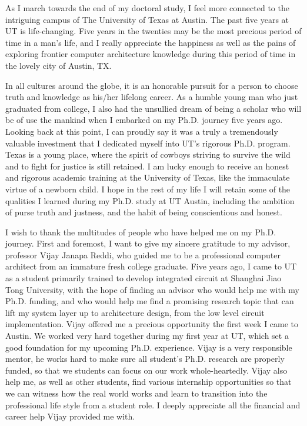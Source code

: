 
\begin{acknowledgments}		%

As I march towards the end of my doctoral study, I feel more connected to the intriguing campus of The University of Texas at Austin. The past five years at UT is life-changing. Five years in the twenties may be the most precious period of time in a man's life, and I really appreciate the happiness as well as the pains of exploring frontier computer architecture knowledge during this period of time in the lovely city of Austin, TX.

In all cultures around the globe, it is an honorable pursuit for a person to choose truth and knowledge as his/her lifelong career. As a humble young man who just graduated from college, I also had the unsullied dream of being a scholar who will be of use the mankind when I embarked on my Ph.D. journey five years ago. Looking back at this point, I can proudly say it was a truly a tremendously valuable investment that I dedicated myself into UT's rigorous Ph.D. program. Texas is a young place, where the spirit of cowboys striving to survive the wild and to fight for justice is still retained. I am lucky enough to receive an honest and rigorous academic training at the University of Texas, like the immaculate virtue of a newborn child. I hope in the rest of my life I will retain some of the qualities I learned during my Ph.D. study at UT Austin, including the ambition of purse truth and justness, and the habit of being conscientious and honest.  

I wish to thank the multitudes of people who have helped me on my Ph.D. journey. First and foremost, I want to give my sincere gratitude to my advisor, professor Vijay Janapa Reddi, who guided me to be a professional computer architect from an immature fresh college graduate. Five years ago, I came to UT as a student primarily trained to develop integrated circuit at Shanghai Jiao Tong University, with the hope of finding an advisor who would help me with my Ph.D. funding, and who would help me find a promising research topic that can lift my system layer up to architecture design, from the low level circuit implementation. Vijay offered me a precious opportunity the first week I came to Austin. We worked very hard together during my first year at UT, which set a good foundation for my upcoming Ph.D. experience. Vijay is a very responsible mentor, he works hard to make sure all student's Ph.D. research are properly funded, so that we students can focus on our work whole-heartedly. Vijay also help me, as well as other students, find various internship opportunities so that we can witness how the real world works and learn to transition into the professional life style from a student role. I deeply appreciate all the financial and career help Vijay provided me with.


\end{acknowledgments}
